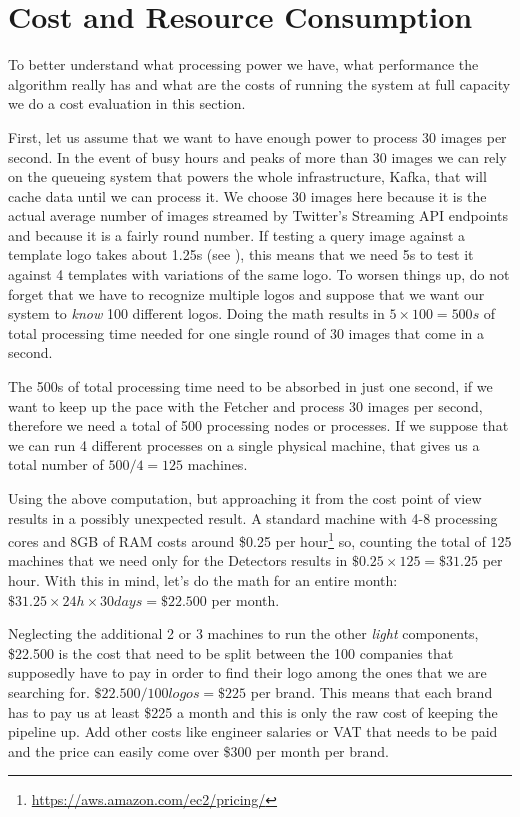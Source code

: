 \section{Cost and Resource Consumption}
\label{sec:cost-and-resource}

To better understand what processing power we have, what performance the
algorithm really has and what are the costs of running the system at full
capacity we do a cost evaluation in this section.

First, let us assume that we want to have enough power to process 30 images
per second. In the event of busy hours and peaks of more than 30 images we can
rely on the queueing system that powers the whole infrastructure, Kafka, that
will cache data until we can process it. We choose 30 images here because it
is the actual average number of images streamed by Twitter's Streaming API
endpoints and because it is a fairly round number. If testing a query image
against a template logo takes about 1.25s (see
), this means that we need 5s to test it
against 4 templates with variations of the same logo. To worsen things up, do
not forget that we have to recognize multiple logos and suppose that we want
our system to \textit{know} 100 different logos. Doing the math results in \(5
\times 100 = 500s \) of total processing time needed for one single round of
30 images that come in a second.

The 500s of total processing time need to be absorbed in just one second, if
we want to keep up the pace with the Fetcher and process 30 images per second,
therefore we need a total of 500 processing nodes or processes. If we suppose
that we can run 4 different processes on a single physical machine, that gives
us a total number of \(500 / 4 = 125\) machines.

Using the above computation, but approaching it from the cost point of view
results in a possibly unexpected result. A standard machine with 4-8
processing cores and 8GB of RAM costs around \$0.25 per
hour\footnote{\url{https://aws.amazon.com/ec2/pricing/}} so, counting the
total of 125 machines that we need only for the Detectors results in \(\$0.25
\times 125 = \$31.25\) per hour. With this in mind, let's do the math for an
entire month: \(\$31.25 \times 24h \times 30days = \$22.500 \) per month.

Neglecting the additional 2 or 3 machines to run the other \textit{light}
components, \$22.500 is the cost that need to be split between the 100
companies that supposedly have to pay in order to find their logo among the
ones that we are searching for. \(\$22.500 / 100 logos = \$225 \) per
brand. This means that each brand has to pay us at least \$225 a month and
this is only the raw cost of keeping the pipeline up. Add other costs like
engineer salaries or VAT that needs to be paid and the price can easily come
over \$300 per month per brand.

